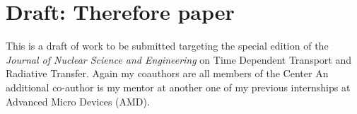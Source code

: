 \label{app:hybridmcatk}


\section{Draft: Therefore paper}
\label{app:therefore}

This is a draft of work to be submitted targeting the special edition of the \textit{Journal of Nuclear Science and Engineering} on Time Dependent Transport and Radiative Transfer.
Again my coauthors are all members of the Center
An additional co-author is my mentor at another one of my previous internships at Advanced Micro Devices (AMD).


